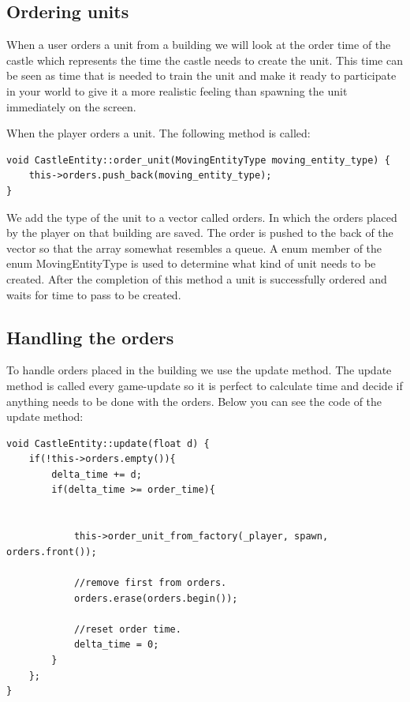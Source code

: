 \subsection{Ordering units}
When a user orders a unit from a building we will look at the order time of the castle which represents the time the castle needs to create the unit. This time can be seen as time that is needed to train the unit and make it ready to participate in your world to give it a more realistic feeling than spawning the unit immediately on the screen. 

When the player orders a unit. The following method is called:

\begin{lstlisting}
void CastleEntity::order_unit(MovingEntityType moving_entity_type) {
    this->orders.push_back(moving_entity_type);
}
\end{lstlisting}

We add the type of the unit to a vector called orders. In which the orders placed by the player on that building are saved. The order is pushed to the back of the vector so that the array somewhat resembles a queue. A enum member of the enum MovingEntityType is used to determine what kind of unit needs to be created. After the completion of this method a unit is successfully ordered and waits for time to pass to be created.

\subsection{Handling the orders}
To handle orders placed in the building we use the update method. The update method is called every game-update so it is perfect to calculate time and decide if anything needs to be done with the orders. Below you can see the code of the update method:


\begin{lstlisting}
void CastleEntity::update(float d) {
    if(!this->orders.empty()){
        delta_time += d;
        if(delta_time >= order_time){


            this->order_unit_from_factory(_player, spawn, orders.front());

            //remove first from orders.
            orders.erase(orders.begin());
 
            //reset order time.
            delta_time = 0;
        }
    };
}
\end{lstlisting}

